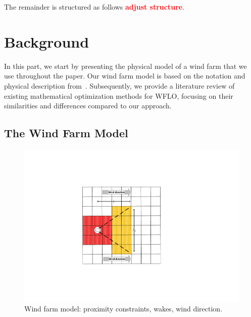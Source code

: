 \documentclass[preprint,12pt]{elsarticle}
\newcommand{\todo}[1]{{\textcolor{red}{\bf {#1}}}}
\begin{document}
The remainder is structured as follows \todo{adjust structure}. 


\section{Background}
\label{sec:related}

In this part, we start
by presenting the
physical model 
of a wind farm that we use throughout the paper.
Our wind farm model is based on
the notation and physical description 
from~\cite{Zhang2014}.  
Subsequently, we provide a literature review of 
existing mathematical
optimization methods for WFLO, focusing
on their similarities and differences
compared to our approach.
 
\subsection{The Wind Farm Model}
\begin{figure}[t]
	\centering
	\includegraphics[scale = 0.9]{field_model.pdf}

	\caption{Wind farm model: proximity constraints, wakes, wind direction.}\label{fig:field_model}
\end{figure}
\end{document}
